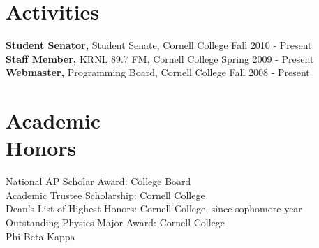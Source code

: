 \documentclass[margin]{res}
\begin{document}
\begin{resume}


\section{Activities}
{\bf Student Senator,} Student Senate, Cornell College \hfill Fall 2010 - Present \\
{\bf Staff Member,} KRNL 89.7 FM, Cornell College \hfill Spring 2009 - Present \\
{\bf Webmaster,} Programming Board, Cornell College \hfill Fall 2008 - Present


\section{Academic \\ Honors}
National AP Scholar Award: College Board \\
Academic Trustee Scholarship: Cornell College \\
Dean's List of Highest Honors: Cornell College, since sophomore year \\
Outstanding Physics Major Award: Cornell College \\
Phi Beta Kappa



\end{resume}
\end{document}
